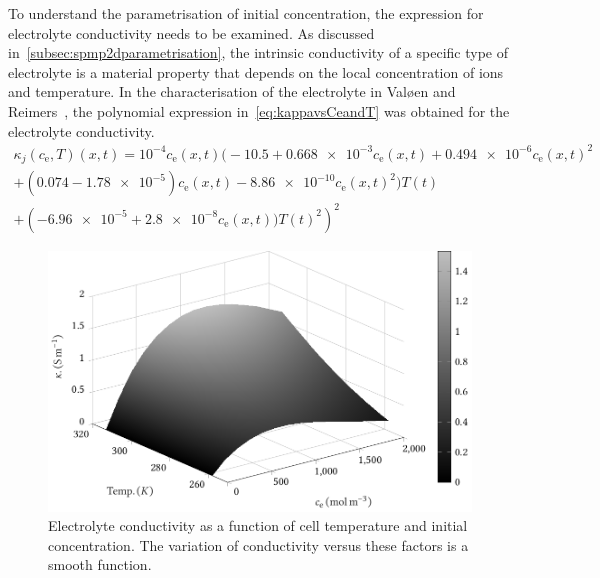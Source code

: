 To  understand  the parametrisation  of  initial  concentration, the  expression
for   electrolyte   conductivity   needs    to   be   examined.   As   discussed
in~\cref{subsec:spmp2dparametrisation}, the intrinsic conductivity of a specific
type  of  electrolyte  is  a  material   property  that  depends  on  the  local
concentration of  ions and  temperature. In the characterisation of the
electrolyte in Valøen and  Reimers~\cite{Valoen2005}, the polynomial expression
in~\cref{eq:kappavsCeandT} was obtained for the electrolyte conductivity.
\begin{multline}\label{eq:kappavsCeandT}
    \kappa_j(c_\text{e},T)(x,t) =  10^{-4} c_\text{e}(x,t) \bigl(-10.5 + \num{0.668e-3} c_\text{e}(x,t) + \num{0.494e-6}  c_\text{e}(x,t)^2\\
        + (0.074 - \num{1.78e-5}) c_\text{e}(x,t) - \num{8.86e-10}
    c_\text{e}(x,t)^2 \bigr)T(t)\\
	+ \left(\num{-6.96e-5} + \num{2.8e-8} c_\text{e}(x,t))T(t)^2\right)^2
\end{multline}

\begin{figure}[tb]
    \centering
    \includegraphics[width=\textwidth]{4/figures/m2t_kappa_ce_T.pdf}
    \caption[Surface plot of electrolyte conductivity]
    {Electrolyte conductivity as a function of cell temperature and initial
        concentration. The variation of conductivity versus these factors is a
    smooth function.}
    \label{fig:kappavsCeandT}
\end{figure}

